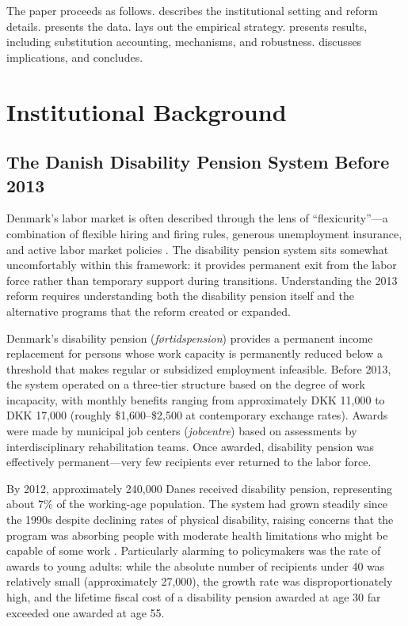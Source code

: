 \documentclass[12pt]{article}
\begin{document}
The paper proceeds as follows.  describes the institutional setting and reform details.  presents the data.  lays out the empirical strategy.  presents results, including substitution accounting, mechanisms, and robustness.  discusses implications, and  concludes.


\section{Institutional Background}
\label{sec:background}

\subsection{The Danish Disability Pension System Before 2013}

Denmark's labor market is often described through the lens of ``flexicurity''---a combination of flexible hiring and firing rules, generous unemployment insurance, and active labor market policies \citep{oecd2010sickness}. The disability pension system sits somewhat uncomfortably within this framework: it provides permanent exit from the labor force rather than temporary support during transitions. Understanding the 2013 reform requires understanding both the disability pension itself and the alternative programs that the reform created or expanded.

Denmark's disability pension (\textit{f\o{}rtidspension}) provides a permanent income replacement for persons whose work capacity is permanently reduced below a threshold that makes regular or subsidized employment infeasible. Before 2013, the system operated on a three-tier structure based on the degree of work incapacity, with monthly benefits ranging from approximately DKK 11,000 to DKK 17,000 (roughly \$1,600--\$2,500 at contemporary exchange rates). Awards were made by municipal job centers (\textit{jobcentre}) based on assessments by interdisciplinary rehabilitation teams. Once awarded, disability pension was effectively permanent---very few recipients ever returned to the labor force.

By 2012, approximately 240,000 Danes received disability pension, representing about 7\% of the working-age population. The system had grown steadily since the 1990s despite declining rates of physical disability, raising concerns that the program was absorbing people with moderate health limitations who might be capable of some work \citep{oecd2010sickness}. Particularly alarming to policymakers was the rate of awards to young adults: while the absolute number of recipients under 40 was relatively small (approximately 27,000), the growth rate was disproportionately high, and the lifetime fiscal cost of a disability pension awarded at age 30 far exceeded one awarded at age 55.
\end{document}
